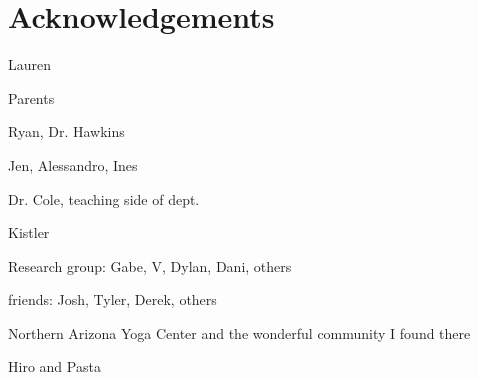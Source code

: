 \chapter*{Acknowledgements}
{}


Lauren

Parents

Ryan, Dr. Hawkins

Jen, Alessandro, Ines

Dr. Cole, teaching side of dept.

Kistler

Research group: Gabe, V, Dylan, Dani, others

friends: Josh, Tyler, Derek, others

Northern Arizona Yoga Center and the wonderful community I found there

Hiro and Pasta
